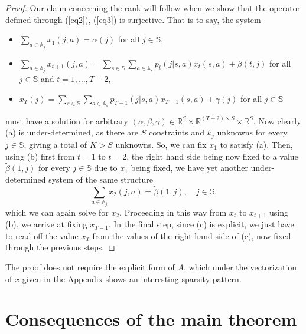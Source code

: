 \documentclass{article}
\theoremstyle{definition}
\newcounter{step}[algorithm]
\numberwithin{equation}{section}
\begin{document}
{\begin{proof}
Our claim concerning the rank will follow when we show that the operator defined through (\ref{eq2}), (\ref{eq3})
is surjective. That is to say, the system
\begin{itemize}
\item[(a)] $\displaystyle\sum_{a\in \mathbb{A}_j} x_1(j,a) = \alpha(j)$ for all $j\in \mathbb{S}$,
\item[(b)] $\displaystyle\sum_{a\in \mathbb{A}_j} x_{t+1}(j,a) = \sum_{s\in \mathbb{S}}\sum_{a\in \mathbb{A}_s}
p_t(j|s,a) x_t(s,a) + \beta(t,j)$ for all $j\in \mathbb{S}$ and $t=1,\dots,T-2$,
\item[(c)] $x_T(j) = \displaystyle\sum_{s\in \mathbb{S}} \sum_{a\in \mathbb{A}_s} p_{T-1}(j|s,a) x_{T-1}(s,a) + \gamma(j)$ for all $j\in \mathbb{S}$
\end{itemize}
must have a solution for arbitrary $(\alpha,\beta,\gamma)\in
\mathbb R^S\times \mathbb R^{(T-2)\times S} \times \mathbb R^S$.
Now clearly (a) is under-determined, as there are $S$ constraints 
and $k_j$ unknowns for every $j\in \mathbb{S}$, giving a total of $K>S$ unknowns. 
So, we can fix $x_1$
to satisfy (a). Then, using (b) first from $t=1$ to $t=2$,
the right hand side being now fixed to a value $\widetilde{\beta}(1,j)$ 
for every $j\in \mathbb{S}$ due to
$x_1$ being fixed, we have yet another under-determined  
system of the same structure
$$
\sum_{a\in \mathbb{A}_j} x_2(j,a) = \widetilde{\beta}(1,j), \quad j\in \mathbb{S},
$$
which we can again solve for $x_2$. Proceeding in this way from $x_t$ to $x_{t+1}$ using (b),
we arrive at fixing $x_{T-1}$. In the final step, since
(c) is explicit, we just have to read off the value $x_T$ from the values of the right hand side of (c), now fixed through the previous steps.
\end{proof}



\noindent The proof does not require the explicit form of $A$, which under the
vectorization of $x$ given in the Appendix shows an interesting sparsity pattern. 
\\

\section{Consequences of the main theorem}
\label{sect_consequences}


}
\end{document}
